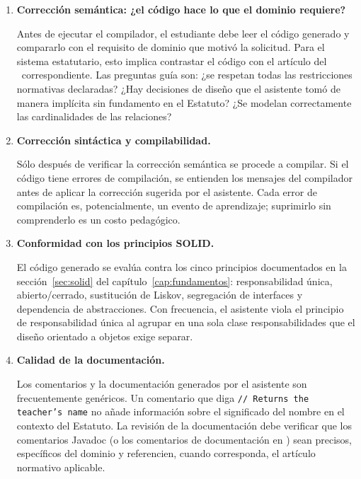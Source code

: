 \begin{enumerate}[label=\textbf{D\arabic*.}, leftmargin=2.5cm]

  \item \textbf{Corrección semántica: ¿el código hace lo que el dominio requiere?}

        Antes de ejecutar el compilador, el estudiante debe leer el código
        generado y compararlo con el requisito de dominio que motivó la
        solicitud. Para el sistema estatutario, esto implica contrastar el
        código con el artículo del \acuerdo\ correspondiente. Las preguntas
        guía son: ¿se respetan todas las restricciones normativas declaradas?
        ¿Hay decisiones de diseño que el asistente tomó de manera implícita
        sin fundamento en el Estatuto? ¿Se modelan correctamente las
        cardinalidades de las relaciones?

  \item \textbf{Corrección sintáctica y compilabilidad.}

        Sólo después de verificar la corrección semántica se procede a
        compilar. Si el código tiene errores de compilación, se entienden
        los mensajes del compilador antes de aplicar la corrección sugerida
        por el asistente. Cada error de compilación es, potencialmente, un
        evento de aprendizaje; suprimirlo sin comprenderlo es un costo
        pedagógico.

  \item \textbf{Conformidad con los principios SOLID.}

        El código generado se evalúa contra los cinco principios documentados
        en la sección~\ref{sec:solid} del capítulo~\ref{cap:fundamentos}:
        responsabilidad única, abierto/cerrado, sustitución de Liskov,
        segregación de interfaces y dependencia de abstracciones. Con
        frecuencia, el asistente viola el principio de responsabilidad única
        al agrupar en una sola clase responsabilidades que el diseño orientado
        a objetos exige separar.

  \item \textbf{Calidad de la documentación.}

        Los comentarios y la documentación generados por el asistente son
        frecuentemente genéricos. Un comentario que diga \texttt{// Returns
        the teacher's name} no añade información sobre el significado del
        nombre en el contexto del Estatuto. La revisión de la documentación
        debe verificar que los comentarios Javadoc (o los comentarios de
        documentación en \rust) sean precisos, específicos del dominio y
        referencien, cuando corresponda, el artículo normativo aplicable.


\end{enumerate}
